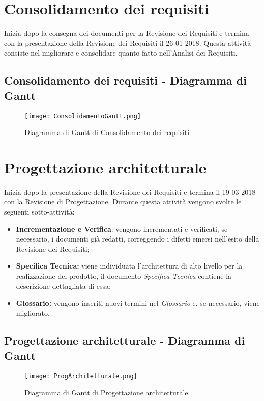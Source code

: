 \documentclass[../PianodiProgetto.tex]{subfiles}
\begin{document}
	\section{Consolidamento dei requisiti} Inizia dopo la consegna dei documenti per la Revisione dei Requisiti e termina con la presentazione della Revisione dei Requisiti il 26-01-2018. Questa attività consiste nel migliorare e consolidare quanto fatto nell'Analisi dei Requisiti.
	\subsection{Consolidamento dei requisiti - Diagramma di Gantt}
	\begin{figure}[H]
		\texttt{[image: ConsolidamentoGantt.png]}	
		\caption{Diagramma di Gantt di Consolidamento dei requisiti}\label{fig:2}
	\end{figure}
	\newpage
	\section{Progettazione architetturale}
	Inizia dopo la presentazione della Revisione dei Requisiti e termina il 19-03-2018 con la Revisione di Progettazione.
	Durante questa attività vengono svolte le seguenti sotto-attività:
	\begin{itemize}	
		\item \textbf{Incrementazione e Verifica}: vengono incrementati e verificati, se necessario, i documenti già redatti, correggendo i difetti emersi nell'esito della Revisione dei Requisiti;
		\item \textbf{Specifica Tecnica:} viene individuata l'architettura di alto livello per la realizzazione del prodotto, il documento \textit{Specifica Tecnica} contiene la descrizione dettagliata di essa;
		\item \textbf{Glossario:} vengono inseriti nuovi termini nel \textit{Glossario} e, se necessario, viene migliorato.
	\end{itemize}
	
	\subsection{Progettazione architetturale - Diagramma di Gantt}
	\begin{figure}[H]
		\texttt{[image: ProgArchitetturale.png]}	
		\caption{Diagramma di Gantt di Progettazione architetturale}\label{fig:3}
	\end{figure}
	\newpage
\end{document}
